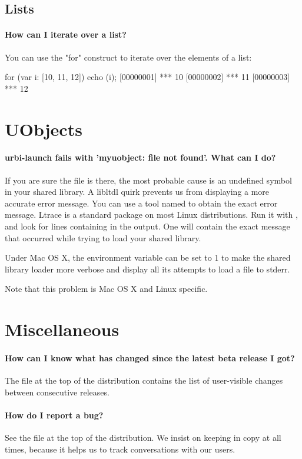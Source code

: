 \subsection{Lists}
\paragraph{How can I iterate over a list?}

You can use the "for" construct to iterate over the elements of a list:

\begin{urbiscript}
for (var i: [10, 11, 12]) echo (i);
[00000001] *** 10
[00000002] *** 11
[00000003] *** 12
\end{urbiscript}


\section{UObjects}

\paragraph{urbi-launch fails with 'myuobject: file not found'. What can I do?}
If you are sure the file is there, the most probable cause is an
undefined symbol in your shared library. A libltdl quirk prevents us
from displaying a more accurate error message.  You can use a tool
named  to obtain the exact error message.  Ltrace is a
standard package on most Linux distributions.  Run it with
, and look for lines
containing  in the output. One will contain the exact
message that occurred while trying to load your shared library.

Under Mac OS X, the  environment variable can
be set to 1 to make the shared library loader more verbose and display
all its attempts to load a file to stderr.

Note that this problem is Mac OS X and Linux specific.

\section{Miscellaneous}
\paragraph{How can I know what has changed since the latest beta release I got?}
The file  at the top of the distribution
contains the list of user-visible changes between consecutive
releases.

\paragraph{How do I report a bug?}
See the file  at the top of the
distribution. We insist on keeping  in
copy at all times, because it helps us to track conversations with our
users.


